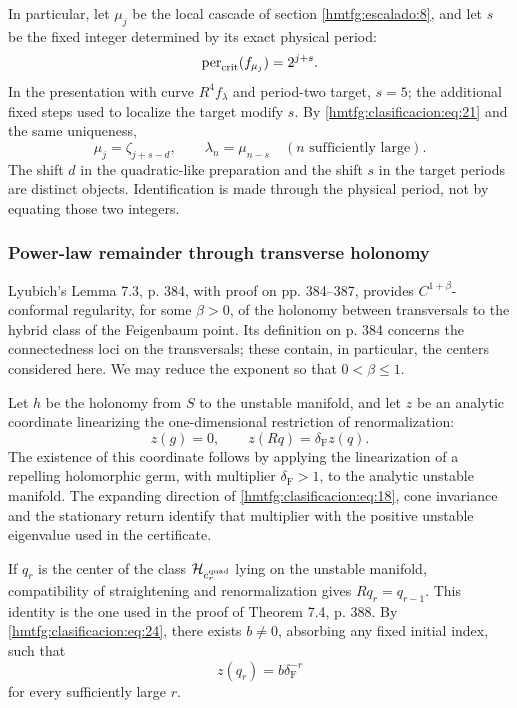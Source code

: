 In particular, let \(\mu_j\) be the local cascade of section \ref{hmtfg:escalado:8}, and let \(s\) be the fixed integer determined by its exact physical period:
\[
\operatorname{per}_{\rm crit}(f_{\mu_j})=2^{j+s}.
\]
In the presentation with curve \(R^4f_\lambda\) and period-two target, \(s=5\); the additional fixed steps used to localize the target modify \(s\). By \eqref{hmtfg:clasificacion:eq:21} and the same uniqueness,
\begin{equation}
\mu_j=\zeta_{j+s-d},\qquad
\boxed{\lambda_n=\mu_{n-s}\quad(n\text{ sufficiently large}).}
\label{hmtfg:clasificacion:eq:23}
\end{equation}
The shift \(d\) in the quadratic-like preparation and the shift \(s\) in the target periods are distinct objects. Identification is made through the physical period, not by equating those two integers.

\subsubsection{Power-law remainder through transverse holonomy}
\label{hmtfg:clasificacion:8.4}

Lyubich’s Lemma 7.3, p. 384, with proof on pp. 384–387, provides \(C^{1+\beta}\)-conformal regularity, for some \(\beta>0\), of the holonomy between transversals to the hybrid class of the Feigenbaum point. Its definition on p. 384 concerns the connectedness loci on the transversals; these contain, in particular, the centers considered here. We may reduce the exponent so that \(0<\beta\le1\).

Let \(h\) be the holonomy from \(S\) to the unstable manifold, and let \(z\) be an analytic coordinate linearizing the one-dimensional restriction of renormalization:
\begin{equation}
z(g)=0,\qquad z(Rq)=\delta_{\mathrm F} z(q).
\label{hmtfg:clasificacion:eq:24}
\end{equation}
The existence of this coordinate follows by applying the linearization of a repelling holomorphic germ, with multiplier \(\delta_{\mathrm F}>1\), to the analytic unstable manifold. The expanding direction of \eqref{hmtfg:clasificacion:eq:18}, cone invariance and the stationary return identify that multiplier with the positive unstable eigenvalue used in the certificate.

If \(q_r\) is the center of the class \(\mathcal H_{c_r^{\rm quad}}\) lying on the unstable manifold, compatibility of straightening and renormalization gives \(Rq_r=q_{r-1}\). This identity is the one used in the proof of Theorem 7.4, p. 388. By \eqref{hmtfg:clasificacion:eq:24}, there exists \(b\ne0\), absorbing any fixed initial index, such that
\begin{equation}
z(q_r)=b\delta_{\mathrm F}^{-r}
\label{hmtfg:clasificacion:eq:25}
\end{equation}
for every sufficiently large \(r\).

